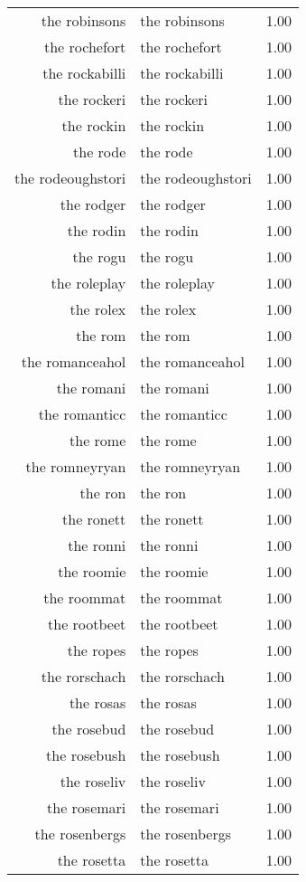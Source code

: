 \begin{table}[ht]
\begin{tabular}{rlr}
  the robinsons & the robinsons & 1.00 \\ 
  the rochefort & the rochefort & 1.00 \\ 
  the rockabilli & the rockabilli & 1.00 \\ 
  the rockeri & the rockeri & 1.00 \\ 
  the rockin & the rockin & 1.00 \\ 
  the rode & the rode & 1.00 \\ 
  the rodeoughstori & the rodeoughstori & 1.00 \\ 
  the rodger & the rodger & 1.00 \\ 
  the rodin & the rodin & 1.00 \\ 
  the rogu & the rogu & 1.00 \\ 
  the roleplay & the roleplay & 1.00 \\ 
  the rolex & the rolex & 1.00 \\ 
  the rom & the rom & 1.00 \\ 
  the romanceahol & the romanceahol & 1.00 \\ 
  the romani & the romani & 1.00 \\ 
  the romanticc & the romanticc & 1.00 \\ 
  the rome & the rome & 1.00 \\ 
  the romneyryan & the romneyryan & 1.00 \\ 
  the ron & the ron & 1.00 \\ 
  the ronett & the ronett & 1.00 \\ 
  the ronni & the ronni & 1.00 \\ 
  the roomie & the roomie & 1.00 \\ 
  the roommat & the roommat & 1.00 \\ 
  the rootbeet & the rootbeet & 1.00 \\ 
  the ropes & the ropes & 1.00 \\ 
  the rorschach & the rorschach & 1.00 \\ 
  the rosas & the rosas & 1.00 \\ 
  the rosebud & the rosebud & 1.00 \\ 
  the rosebush & the rosebush & 1.00 \\ 
  the roseliv & the roseliv & 1.00 \\ 
  the rosemari & the rosemari & 1.00 \\ 
  the rosenbergs & the rosenbergs & 1.00 \\ 
  the rosetta & the rosetta & 1.00 \\ 

\end{tabular}
\end{table}
